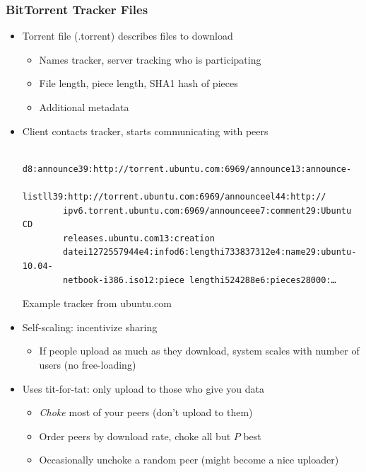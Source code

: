 \subsubsection{BitTorrent Tracker Files}
\begin{itemize}[nosep]
    \item Torrent file (.torrent) describes files to download
          \begin{itemize}[nosep]
              \item Names tracker, server tracking who is participating
              \item File length, piece length, SHA1 hash of pieces
              \item Additional metadata
          \end{itemize}
    \item Client contacts tracker, starts communicating with peers
          \begin{verbatim}
        d8:announce39:http://torrent.ubuntu.com:6969/announce13:announce-
        listll39:http://torrent.ubuntu.com:6969/announceel44:http://
        ipv6.torrent.ubuntu.com:6969/announceee7:comment29:Ubuntu CD
        releases.ubuntu.com13:creation
        datei1272557944e4:infod6:lengthi733837312e4:name29:ubuntu-10.04-
        netbook-i386.iso12:piece lengthi524288e6:pieces28000:…
    \end{verbatim}
          Example tracker from ubuntu.com
    \item Self-scaling: incentivize sharing
          \begin{itemize}[nosep]
              \item If people upload as much as they download, system scales with number of users (no free-loading)
          \end{itemize}
    \item Uses tit-for-tat: only upload to those who give you data
          \begin{itemize}[nosep]
              \item \emph{Choke} most of your peers (don't upload to them)
              \item Order peers by download rate, choke all but $P$ best
              \item Occasionally unchoke a random peer (might become a nice uploader)
          \end{itemize}
\end{itemize}
